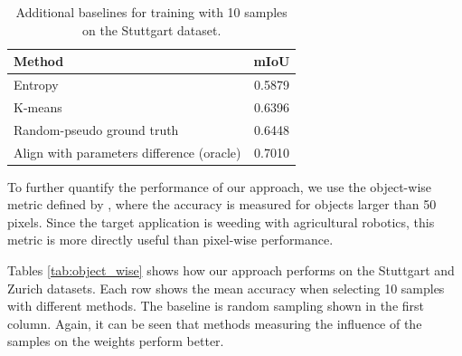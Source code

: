 \documentclass[letterpaper, 10 pt, conference]{ieeeconf}  %
\begin{document}
    
        \begin{table}
           \vspace{1em}
        \centering
        \caption{Additional baselines for training with 10 samples on the Stuttgart dataset.}
        \begin{tabular}{@{}lc@{}} 
            \toprule
            Method  & mIoU \\ 
            \midrule 
             Entropy   \cite{chakraborty2015active, zhou2017fine} & 0.5879   \\ \addlinespace
    		  K-means  & 0.6396  \\ \addlinespace
    		  Random-pseudo ground truth   & 0.6448  \\ \addlinespace
    		  Align with parameters difference (oracle)  & 0.7010  \\  
            \bottomrule
        \end{tabular}
        \label{tab:add_baselines}
    \end{table}
    
    
    
To further quantify the performance of our approach, we use the object-wise metric defined by \cite{milioto2018real}, where the accuracy is measured for objects larger than 50 pixels. Since the target application is weeding with agricultural robotics, this metric is more directly useful than pixel-wise performance.  


Tables \ref{tab:object_wise} shows how our approach performs on the Stuttgart and Zurich datasets. Each row shows the mean accuracy when selecting 10 samples with different methods. The baseline is random sampling shown in the first column. Again, it can be seen that methods measuring the influence of the samples on the weights perform better.

\end{document}
